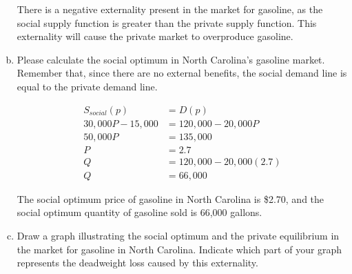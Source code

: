 \documentclass{article}
\begin{document}
\begin{enumerate}[(a)]
    There is a negative externality present in the market for gasoline, as the social supply function is greater than the private supply function. This externality will cause the private market to overproduce gasoline.
    \pagebreak
    \item Please calculate the social optimum in North Carolina's gasoline market. Remember that, since there are no external benefits, the social demand line is equal to the private demand line.
    
    \begin{align*}
        S_{social}(p) &= D(p)\\
        30,000P - 15,000 &= 120,000 - 20,000P\\
        50,000P &= 135,000\\
        P &= 2.7\\
        Q &= 120,000 - 20,000(2.7)\\
        Q &= 66,000
    \end{align*}

    The social optimum price of gasoline in North Carolina is \$2.70, and the social optimum quantity of gasoline sold is 66,000 gallons.

    \item Draw a graph illustrating the social optimum and the private equilibrium in the market for gasoline in North Carolina. Indicate which part of your graph represents the deadweight loss caused by this externality.
    

\end{enumerate}
\end{document}
